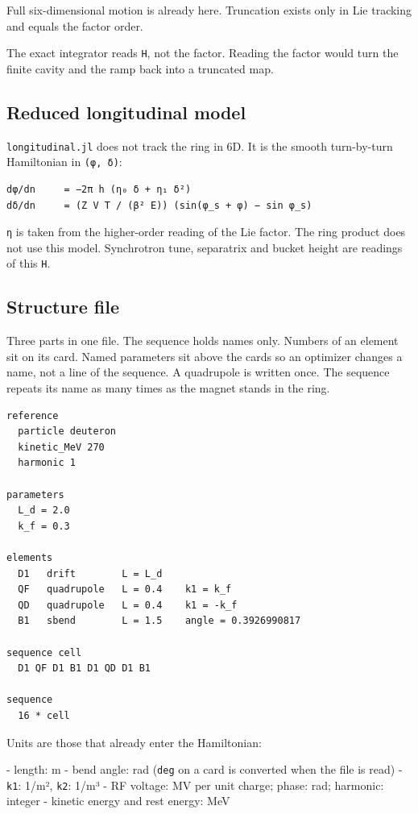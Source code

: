 \documentclass[11pt,a4paper]{article}
\begin{document}
Full six-dimensional motion is already here. Truncation exists only in
Lie tracking and equals the factor order.

The exact integrator reads \texttt{H}, not the factor. Reading the factor would
turn the finite cavity and the ramp back into a truncated map.

\subsection{Reduced longitudinal model}

\texttt{longitudinal.jl} does not track the ring in 6D. It is the smooth
turn-by-turn Hamiltonian in \texttt{(φ, δ)}:

\begin{verbatim}
dφ/dn     = −2π h (η₀ δ + η₁ δ²)
dδ/dn     = (Z V T / (β² E)) (sin(φ_s + φ) − sin φ_s)
\end{verbatim}

\texttt{η} is taken from the higher-order reading of the Lie factor. The ring
product does not use this model. Synchrotron tune, separatrix and bucket
height are readings of this \texttt{H}.

\subsection{Structure file}

Three parts in one file. The sequence holds names only. Numbers of an
element sit on its card. Named parameters sit above the cards so an
optimizer changes a name, not a line of the sequence. A quadrupole is
written once. The sequence repeats its name as many times as the magnet
stands in the ring.

\begin{verbatim}
reference
  particle deuteron
  kinetic_MeV 270
  harmonic 1

parameters
  L_d = 2.0
  k_f = 0.3

elements
  D1   drift        L = L_d
  QF   quadrupole   L = 0.4    k1 = k_f
  QD   quadrupole   L = 0.4    k1 = -k_f
  B1   sbend        L = 1.5    angle = 0.3926990817

sequence cell
  D1 QF D1 B1 D1 QD D1 B1

sequence
  16 * cell
\end{verbatim}

Units are those that already enter the Hamiltonian:

- length: m
- bend angle: rad (\texttt{deg} on a card is converted when the file is read)
- \texttt{k1}: 1/m², \texttt{k2}: 1/m³
- RF voltage: MV per unit charge; phase: rad; harmonic: integer
- kinetic energy and rest energy: MeV
\end{document}
